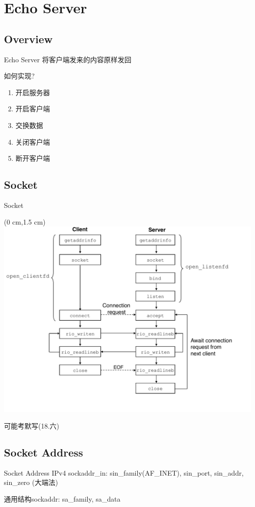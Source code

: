 \documentclass[]{beamer}
\begin{document}
\section{Echo Server}
\subsection{Overview}
\begin{frame}{Echo Server}
	将客户端发来的内容原样发回
	
	如何实现?
	\begin{enumerate}
		\item<1-> 开启服务器
		\item<1-> 开启客户端
		\item<1-> 交换数据
		\item<1-> 关闭客户端
		\item<1-> 断开客户端
	\end{enumerate}
\end{frame}

\subsection{Socket}
\begin{frame}{Socket}
	\begin{textblock*}{11.8cm}(0 cm,1.5 cm)
	\includegraphics[width=0.7\linewidth]{figures/sockoverview}
	\end{textblock*}
	\qquad \qquad \qquad \qquad \qquad \qquad \qquad \qquad  \qquad \quad 可能考默写(18.六)
\end{frame}

\subsection{Socket Address}
\begin{frame}{Socket Address}
	IPv4 sockaddr\_in: sin\_family(AF\_INET), sin\_port, sin\_addr, sin\_zero (大端法)
	
	通用结构sockaddr: sa\_family, sa\_data
\end{frame}
\end{document}
